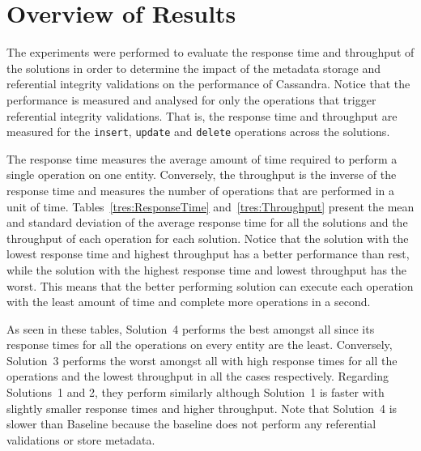 \section{Overview of Results} \label{s:results-overview}

The experiments were performed to evaluate the response time and throughput of
the solutions in order to determine the impact of the metadata storage and
referential integrity validations on the performance of Cassandra. Notice that
the performance is measured and analysed for only the operations that trigger
referential integrity validations. That is, the response
time and throughput are measured for the \texttt{insert}, \texttt{update} and
\texttt{delete} operations across the solutions.

The response time measures the average amount of time required to perform a
single operation on one entity. Conversely,  the throughput is the inverse of
the response time and measures the number of operations that are performed in a
unit of time. Tables~\ref{tres:ResponseTime} and~\ref{tres:Throughput} present
the mean and standard deviation of the average response time for all the
solutions and the throughput of each operation for each solution.  Notice that
the solution with the lowest response time and highest throughput has a better
performance than rest,  while the solution with the highest response time and
lowest throughput has the worst. This means that the better performing solution
can execute each operation with the least amount of time and complete more
operations in a second.



As seen in these tables,  Solution~4 performs the best amongst all since its
response times for all the  operations on every entity are the least. 
Conversely,  Solution~3 performs the worst amongst all with high response times
for all the operations and the lowest throughput in all the cases respectively. 
Regarding Solutions~1 and 2,  they perform similarly although Solution~1 is
faster with slightly smaller response times and higher throughput.  Note that
Solution~4 is slower than  Baseline  because the baseline does not perform any
referential validations or store metadata. 

